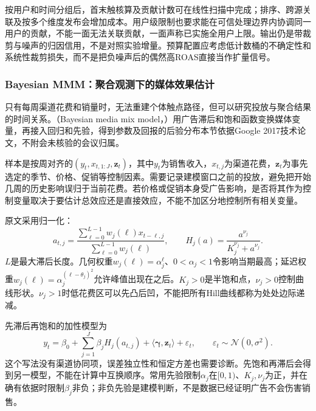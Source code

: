 按用户和时间分组后，首末触核算及贡献计数可在线性扫描中完成；排序、跨源关联及按多个维度发布会增加成本。用户级限制也要求能在可信处理边界内协调同一用户的贡献，不能一面无法关联贡献，一面声称已实施全用户上限。输出仍是带裁剪与噪声的归因信用，不是对照实验增量。预算配置应考虑低计数桶的不确定性和系统性裁剪损失，而不是把负噪声后的偶然高ROAS直接当作扩量信号。

\subsubsection{Bayesian MMM：聚合观测下的媒体效果估计}
\label{sec:rs-advertising-mmm}

只有每周渠道花费和销量时，无法重建个体触点路径，但可以研究投放与聚合结果的时间关系。（Bayesian media mix model，）用广告滞后和饱和函数变换媒体变量，再接入回归和先验，得到参数及回报的后验分布本节依据Google 2017技术论文，不附会未核验的会议归属。

样本是按周对齐的$(y_t,x_{t,1:J},\bm z_t)$，其中$y_t$为销售收入，$x_{t,j}$为渠道花费，$\bm z_t$为事先选定的季节、价格、促销等控制因素。需要记录建模窗口之前的投放，避免把开始几周的历史影响误归于当前花费。若价格或促销本身受广告影响，是否将其作为控制变量取决于要估计总效应还是直接效应，不能不加区分地控制所有相关变量。

原文采用归一化：
\begin{equation}
  a_{t,j}
   =\frac{\sum_{\ell=0}^{L-1}w_j(\ell)x_{t-\ell,j}}
           {\sum_{\ell=0}^{L-1}w_j(\ell)},\qquad
  H_j(a)=\frac{a^{\nu_j}}{K_j^{\nu_j}+a^{\nu_j}}.
  \label{eq:rs-advertising-mmm-transform}
\end{equation}
$L$是最大滞后长度。几何权重$w_j(\ell)=\alpha_j^\ell$、$0<\alpha_j<1$令影响当期最高；延迟权重$w_j(\ell)=\alpha_j^{(\ell-\theta_j)^2}$允许峰值出现在之后。$K_j>0$是半饱和点，$\nu_j>0$控制曲线形状。$\nu_j>1$时低花费区可以先凸后凹，不能把所有Hill曲线都称为处处边际递减。

先滞后再饱和的加性模型为
\begin{equation}
  y_t=\beta_0+\sum_{j=1}^{J}\beta_jH_j(a_{t,j})
           +\langle\bm\gamma,\bm z_t\rangle+\varepsilon_t,
   \qquad \varepsilon_t\sim\mathcal N(0,\sigma^2).
  \label{eq:rs-advertising-mmm-regression}
\end{equation}
这个写法没有渠道协同项，误差独立性和恒定方差也需要诊断。先饱和再滞后会得到另一模型，不能在计算中互换顺序。常用先验限制$\alpha_j$在$[0,1)$、$K_j,\nu_j$为正，并在确有依据时限制$\beta_j$非负；非负先验是建模判断，不是数据已经证明广告不会伤害销售。

